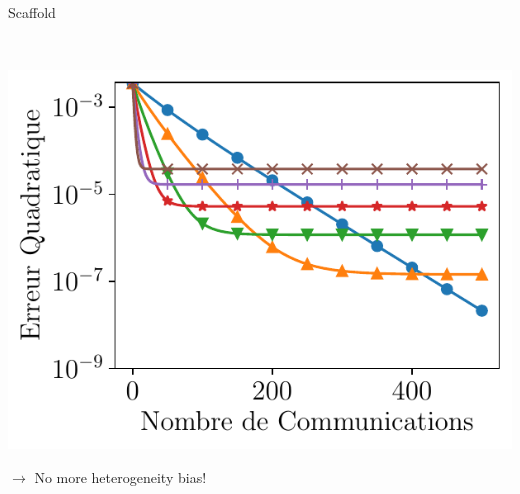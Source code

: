 \documentclass[aspectratio=169,12pt]{beamer}
\begin{document}
\begin{frame}[t]{Scaffold ~~~  ~~}
\begin{minipage}{0.5\linewidth}
  \end{minipage}~%
  \begin{minipage}{0.48\linewidth}
  \pause
       \begin{center}
    \includegraphics[width=0.75\linewidth]{images/local_training_heterogeneous.pdf}%
  \end{center}
  
    \vspace{-0.5em}

  $\rightarrow$ No more heterogeneity bias!

  \end{minipage}

  \vspace{1.5em}


\end{frame}
\end{document}
